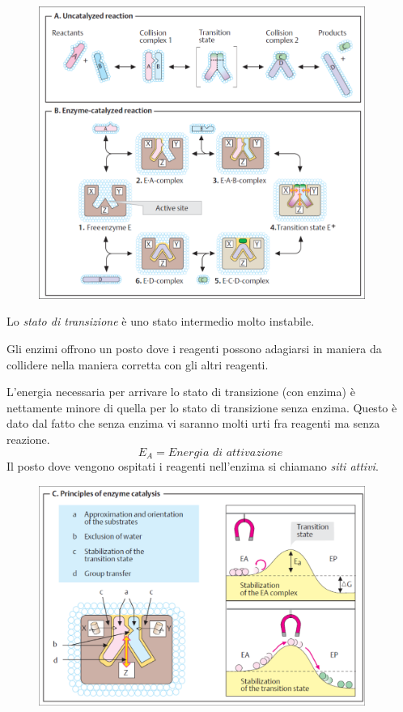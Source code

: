 \documentclass[a4paper]{article}
\begin{document}
\pagebreak

\begin{figure}[h]
    \centering
    \includegraphics[width=0.95\textwidth]{./reactions_cat.png}
\end{figure}

Lo \textit{stato di transizione} è uno stato intermedio molto instabile.

Gli enzimi offrono un posto dove i reagenti possono adagiarsi in maniera da collidere nella maniera
corretta con gli altri reagenti.

L'energia necessaria per arrivare lo stato di transizione (con enzima) è nettamente
minore di quella per lo stato di transizione senza enzima.
Questo è dato dal fatto che senza enzima vi saranno molti urti fra reagenti ma senza reazione.
\[
    E_A = \textit{Energia di attivazione}
\]
Il posto dove vengono ospitati i reagenti nell'enzima si chiamano \textit{siti attivi}.

\pagebreak

\begin{figure}[ht]
    \centering
    \includegraphics[width=0.95\textwidth]{./enzym_cat.png}
\end{figure}
\end{document}

